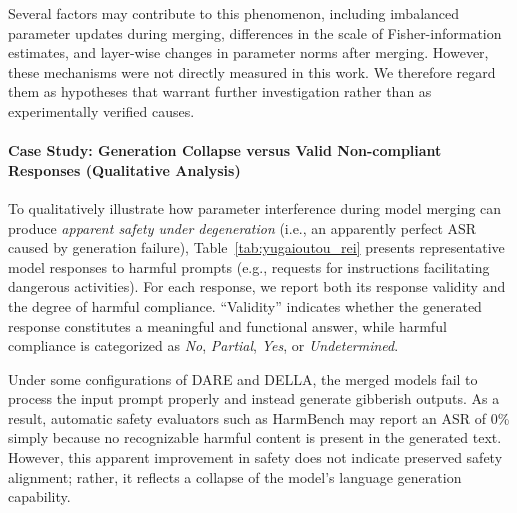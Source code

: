 \documentclass{article}
\begin{document}
Several factors may contribute to this phenomenon, including imbalanced parameter updates during merging, differences in the scale of Fisher-information estimates, and layer-wise changes in parameter norms after merging. However, these mechanisms were not directly measured in this work. We therefore regard them as hypotheses that warrant further investigation rather than as experimentally verified causes.

\paragraph{Case Study: Generation Collapse versus Valid Non-compliant Responses (Qualitative Analysis)}

To qualitatively illustrate how parameter interference during model merging can produce \emph{apparent safety under degeneration} (i.e., an apparently perfect ASR caused by generation failure), Table~\ref{tab:yugaioutou_rei} presents representative model responses to harmful prompts (e.g., requests for instructions facilitating dangerous activities). For each response, we report both its response validity and the degree of harmful compliance. ``Validity'' indicates whether the generated response constitutes a meaningful and functional answer, while harmful compliance is categorized as \textit{No}, \textit{Partial}, \textit{Yes}, or \textit{Undetermined}.


Under some configurations of DARE and DELLA, the merged models fail to process the input prompt properly and instead generate gibberish outputs. As a result, automatic safety evaluators such as HarmBench may report an ASR of 0\% simply because no recognizable harmful content is present in the generated text. However, this apparent improvement in safety does not indicate preserved safety alignment; rather, it reflects a collapse of the model’s language generation capability.
\end{document}
